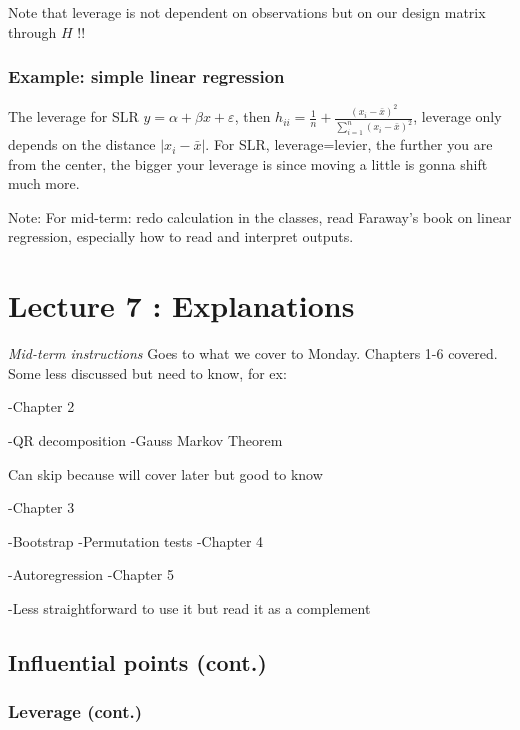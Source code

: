 \documentclass[
]{article}
\begin{document}
Note that leverage is not dependent on observations but on our design
matrix through \(H\) !!

\hypertarget{example-simple-linear-regression}{%
\subsubsection{Example: simple linear
regression}\label{example-simple-linear-regression}}

The leverage for SLR \(y=\alpha+\beta x+\varepsilon\), then
\(h_{ii}=\frac{1}{n}+\frac{(x_i-\bar{x})^2}{\sum_{i=1}^n (x_i-\bar{x})^2}\),
leverage only depends on the distance \(|x_i-\bar{x}|\). For SLR,
leverage=levier, the further you are from the center, the bigger your
leverage is since moving a little is gonna shift much more.

Note: For mid-term: redo calculation in the classes, read Faraway's book
on linear regression, especially how to read and interpret outputs.

\hypertarget{lecture-7-explanations}{%
\section{Lecture 7 : Explanations}\label{lecture-7-explanations}}

\emph{Mid-term instructions} Goes to what we cover to Monday. Chapters
1-6 covered. Some less discussed but need to know, for ex:

-Chapter 2

-QR decomposition -Gauss Markov Theorem

Can skip because will cover later but good to know

-Chapter 3

-Bootstrap -Permutation tests -Chapter 4

-Autoregression -Chapter 5

-Less straightforward to use it but read it as a complement

\hypertarget{influential-points-cont.}{%
\subsection{Influential points (cont.)}\label{influential-points-cont.}}

\hypertarget{leverage-cont.}{%
\subsubsection{Leverage (cont.)}\label{leverage-cont.}}
\end{document}
